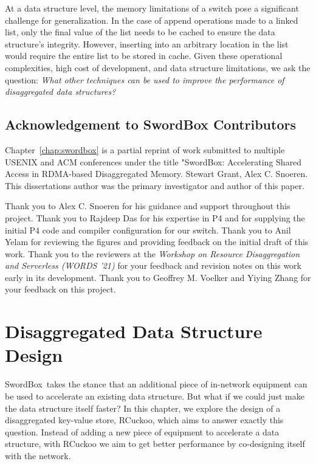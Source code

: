 \documentclass[12pt]{ucsddissertation}
\newcommand{\sword}{SwordBox}
\begin{document}
At a data structure level, the memory limitations of a switch pose a significant challenge for
generalization. In the case of append operations made to a linked list, only the final value of the
list needs to be cached to ensure the data structure's integrity. However, inserting into an
arbitrary location in the list would require the entire list to be stored in cache. Given these
operational complexities, high cost of development, and data structure limitations, we ask the
question: \textit{What other techniques can be used to improve the performance of disaggregated data
structures?}

\section{Acknowledgement to {\sword} Contributors}

Chapter~\ref{chap:swordbox} is a partial reprint of work submitted to multiple USENIX and ACM
conferences under the title "SwordBox: Accelerating Shared Access in RDMA-based Disaggregated
Memory. Stewart Grant, Alex C. Snoeren. This dissertations author was the primary investigator and
author of this paper.

Thank you to Alex C. Snoeren for his guidance and support throughout this project. Thank you to
Rajdeep Das for his expertise in P4 and for supplying the initial P4 code and compiler configuration
for our switch. Thank you to Anil Yelam for reviewing the figures and providing feedback on the
initial draft of this work. Thank you to the reviewers at the \textit{Workshop on Resource
Disaggregation and Serverless (WORDS '21)} for your feedback and revision notes on this work early
in its development. Thank you to Geoffrey M. Voelker and Yiying Zhang for your feedback on this
project.



\chapter{Disaggregated Data Structure Design}
\label{chap:rcuckoo}


\sword\ takes the stance that an additional piece of in-network equipment can be used to accelerate
an existing data structure. But what if we could just make the data structure itself faster? In this
chapter, we explore the design of a disaggregated key-value store, RCuckoo, which aims to answer
exactly this question. Instead of adding a new piece of equipment to accelerate a data structure,
with RCuckoo we aim to get better performance by co-designing itself with the network.
\end{document}
